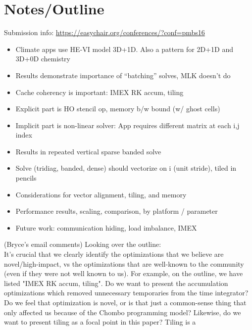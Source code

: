 \documentclass[conference]{IEEEtran}
\begin{document}



% 

\section*{Notes/Outline}
Submission info:
\url{https://easychair.org/conferences/?conf=pmbs16}

\begin{itemize}
\item Climate apps use HE-VI model 3D+1D. Also a pattern for 2D+1D and 3D+0D chemistry
\item Results demonstrate importance of ``batching'' solves, MLK doesn't do
\item Cache coherency is important: IMEX RK accum, tiling
\item Explicit part is HO stencil op, memory b/w bound (w/ ghost cells)
\item Implicit part is non-linear solver: App requires different matrix at each i,j index 
\item Results in repeated vertical sparse banded solve
\item Solve (tridiag, banded, dense) should vectorize on i (unit stride), tiled in pencils
\item Considerations for vector alignment, tiling, and memory
\item Performance results, scaling, comparison, by platform / parameter
\item Future work: communication hiding, load imbalance, IMEX
\end{itemize}
(Bryce's email comments) Looking over the outline:
\\
It's crucial that we clearly identify the optimizations that we
believe are novel/high-impact, vs the optimizations that are
well-known to the community (even if they were not well known to us).
For example, on the outline, we have listed "IMEX RK accum, tiling".
Do we want to present the accumulation optimizations which removed
unnecessary temporaries from the time integrator? Do we feel that
optimization is novel, or is that just a common-sense thing that only
affected us because of the Chombo programming model? Likewise, do we
want to present tiling as a focal point in this paper? Tiling is a
\end{document}
